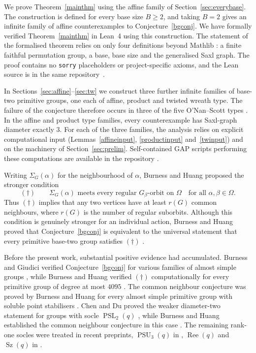 \documentclass[a4paper,reqno,11pt]{amsart}
\numberwithin{equation}{section}
\begin{document}
We prove Theorem~\ref{mainthm} using the affine family of Section~\ref{sec:everybase}. The construction is defined for every base size $B\ge2$, and taking $B=2$ gives an infinite family of affine counterexamples to Conjecture~\ref{bgconj}. We have formally verified Theorem~\ref{mainthm} in Lean~4 \cite{Lean4} using this construction. The statement of the formalised theorem relies on only four definitions beyond Mathlib \cite{Mathlib}: a finite faithful permutation group, a base, base size and the generalised Saxl graph. The proof contains no \texttt{sorry} placeholders or project-specific axioms, and the Lean source is in the same repository~\cite{AlunaAdam}.

In Sections~\ref{sec:affine}--\ref{sec:tw} we construct three further infinite families of base-two primitive groups, one each of affine, product and twisted wreath type. The failure of the conjecture therefore occurs in three of the five O'Nan--Scott types \cite[Theorem~4.1A]{DM}. In the affine and product type families, every counterexample has Saxl-graph diameter exactly $3$. For each of the three families, the analysis relies on explicit computational input (Lemmas~\ref{affineinput}, \ref{productinput} and~\ref{twinput}) and on the machinery of Section~\ref{sec:prelim}. Self-contained GAP \cite{GAP} scripts performing these computations are available in the repository \cite{AlunaAdam}.

 Writing $\Sigma_G(\alpha)$ for the neighbourhood of $\alpha$, Burness and Huang proposed the stronger condition
\[
(\dagger)\qquad
\Sigma_G(\alpha)\text{ meets every regular }G_\beta\text{-orbit on }\Omega
\quad\text{for all }\alpha,\beta\in\Omega.
\]
Thus $(\dagger)$ implies that any two vertices have at least $r(G)$ common neighbours, where $r(G)$ is the number of regular suborbits. Although this condition is genuinely stronger for an individual action, Burness and Huang proved that Conjecture~\ref{bgconj} is equivalent to the universal statement that every primitive base-two group satisfies $(\dagger)$ \cite[Conjecture~5.8 and Proposition~5.9]{BH}.

Before the present work, substantial positive evidence had accumulated. Burness and Giudici verified Conjecture~\ref{bgconj} for various families of almost simple groups \cite{BG}, while Burness and Huang verified $(\dagger)$ computationally for every primitive group of degree at most $4095$ \cite[Remark~5.10]{BH}. The common neighbour conjecture was proved by Burness and Huang for every almost simple primitive group with soluble point stabilisers \cite{BHs}. Chen and Du proved the weaker diameter-two statement for groups with socle $\operatorname{PSL}_2(q)$ \cite{CD}, while Burness and Huang established the common neighbour conjecture in this case \cite[Theorem~4.22]{BHs}. The remaining rank-one socles were treated in recent preprints, $\operatorname{PSU}_3(q)$ in \cite{CDL}, $\operatorname{Ree}(q)$ and $\operatorname{Sz}(q)$ in \cite{CDR}. 
\end{document}
